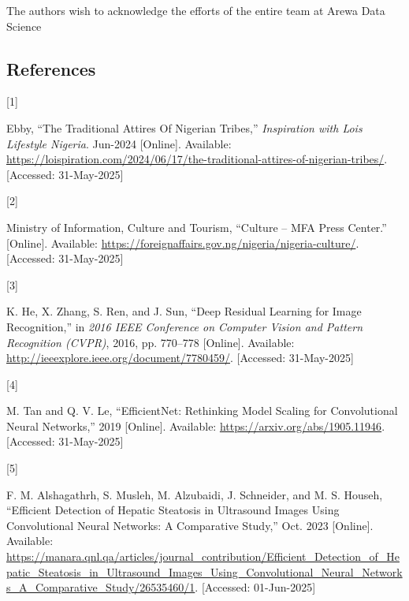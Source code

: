 \documentclass[
  journal,
]{IEEEtran}%
\newlength{\cslhangindent}
\newlength{\csllabelwidth}
\newenvironment{CSLReferences}[2] %
 {\begin{list}{}{%
  \setlength{\itemindent}{0pt}
  \setlength{\leftmargin}{0pt}
  \setlength{\parsep}{0pt}
  \ifodd #1
   \setlength{\leftmargin}{\cslhangindent}
   \setlength{\itemindent}{-1\cslhangindent}
  \fi
  \setlength{\itemsep}{#2\baselineskip}}}
 {\end{list}}
\newcommand{\CSLLeftMargin}[1]{\parbox[t]{\csllabelwidth}{\strut#1\strut}}
\newcommand{\CSLRightInline}[1]{\parbox[t]{\linewidth - \csllabelwidth}{\strut#1\strut}}
\begin{document}
The authors wish to acknowledge the efforts of the entire team at Arewa
Data Science

\subsection*{References}\label{references}

\label{refs}
\begin{CSLReferences}{0}{0}
\CSLLeftMargin{{[}1{]} }%
\CSLRightInline{Ebby, {``The {Traditional} {Attires} {Of} {Nigerian}
{Tribes},''} \emph{Inspiration with Lois{\textbar} Lifestyle {\textbar}
Nigeria}. Jun-2024 {[}Online{]}. Available:
\url{https://loispiration.com/2024/06/17/the-traditional-attires-of-nigerian-tribes/}.
{[}Accessed: 31-May-2025{]}}

\CSLLeftMargin{{[}2{]} }%
\CSLRightInline{Ministry of Information, Culture and Tourism, {``Culture
-- {MFA} {Press} {Center}.''} {[}Online{]}. Available:
\url{https://foreignaffairs.gov.ng/nigeria/nigeria-culture/}.
{[}Accessed: 31-May-2025{]}}

\CSLLeftMargin{{[}3{]} }%
\CSLRightInline{K. He, X. Zhang, S. Ren, and J. Sun, {``Deep {Residual}
{Learning} for {Image} {Recognition},''} in \emph{2016 {IEEE}
{Conference} on {Computer} {Vision} and {Pattern} {Recognition}
({CVPR})}, 2016, pp. 770--778 {[}Online{]}. Available:
\url{http://ieeexplore.ieee.org/document/7780459/}. {[}Accessed:
31-May-2025{]}}

\CSLLeftMargin{{[}4{]} }%
\CSLRightInline{M. Tan and Q. V. Le, {``{EfficientNet}: {Rethinking}
{Model} {Scaling} for {Convolutional} {Neural} {Networks},''} 2019
{[}Online{]}. Available: \url{https://arxiv.org/abs/1905.11946}.
{[}Accessed: 31-May-2025{]}}

\CSLLeftMargin{{[}5{]} }%
\CSLRightInline{F. M. Alshagathrh, S. Musleh, M. Alzubaidi, J.
Schneider, and M. S. Househ, {``Efficient {Detection} of {Hepatic}
{Steatosis} in {Ultrasound} {Images} {Using} {Convolutional} {Neural}
{Networks}: {A} {Comparative} {Study},''} Oct. 2023 {[}Online{]}.
Available:
\url{https://manara.qnl.qa/articles/journal_contribution/Efficient_Detection_of_Hepatic_Steatosis_in_Ultrasound_Images_Using_Convolutional_Neural_Networks_A_Comparative_Study/26535460/1}.
{[}Accessed: 01-Jun-2025{]}}


\end{CSLReferences}
\end{document}
